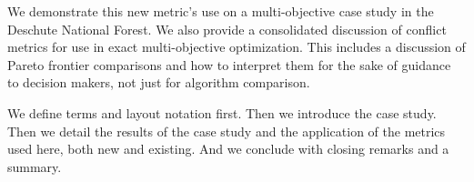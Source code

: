We demonstrate this new metric's use on a multi-objective case study in the Deschute National Forest. We also provide a consolidated discussion of conflict metrics for use in exact multi-objective optimization. This includes a discussion of Pareto frontier comparisons and how to interpret them for the sake of guidance to decision makers, not just for algorithm comparison.

We define terms and layout notation first. Then we introduce the case study. Then we detail the results of the case study and the application of the metrics used here, both new and existing. And we conclude with closing remarks and a summary.
